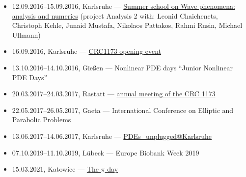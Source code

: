 \begin{itemize}
  \item 12.09.2016--15.09.2016, Karlsruhe --- \href{https://www.waves.kit.edu/summerschool2016.php}{Summer school on Wave phenomena: analysis and numerics} (project Analysis 2 with: Leonid Chaichenets, Christoph Kehle, Junaid Mustafa, Nikolaos Pattakos, Rahmi Rusin, Michael Ullmann)
  \item 16.09.2016, Karlsruhe --- \href{https://www.waves.kit.edu/openingevent.php}{CRC1173 opening event}
  \item 13.10.2016--14.10.2016, Gießen --- Nonlinear PDE days ``Junior Nonlinear PDE Days''
  \item 20.03.2017--24.03.2017, Rastatt --- \href{\urlSecondAnnualCrc}{ annual meeting of the CRC 1173}
  \item 22.05.2017--26.05.2017, Gaeta --- International Conference on Elliptic and Parabolic Problems
  \item 13.06.2017--14.06.2017, Karlsruhe --- \href{https://www.math.kit.edu/iana2/event/pdeunplugrei_17/en}{PDEs\_unplugged@Karlsruhe}
  \item 07.10.2019--11.10.2019, Lübeck --- Europe Biobank Week 2019
  \item 15.03.2021, Katowice --- \href{\urlPiXV}{The $\pi$ day}
\end{itemize}
